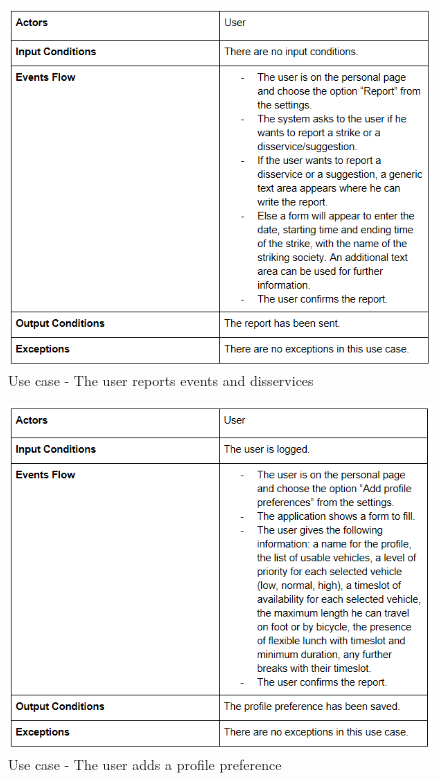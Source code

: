 \begin{figure}
	\centering
	\includegraphics{Images/UseCaseTables/9_usr_report.PNG}
	\caption{\label{fig:useCase9}Use case - The user reports events and disservices  }
\end{figure}

\begin{figure}
	\centering
	\includegraphics{Images/UseCaseTables/10_usr_add_pro_pref.PNG}
	\caption{\label{fig:useCase10}Use case - The user adds a profile preference  }
\end{figure}


